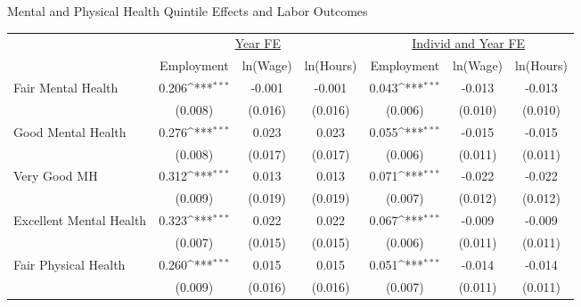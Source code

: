\def\sym#1{\ifmmode^{#1}\else\(^{#1}\)\fi}
\caption{Mental and Physical Health Quintile Effects and Labor Outcomes}
\footnotesize\begin{tabular}{l*{6}{c}}
                    &\multicolumn{3}{c}{\underline{Year FE}}                          &\multicolumn{3}{c}{\underline{Individ and Year FE}}              \\\cmidrule(lr){2-4}\cmidrule(lr){5-7}
                    &\multicolumn{1}{c}{Employment}&\multicolumn{1}{c}{ln(Wage)}&\multicolumn{1}{c}{ln(Hours)}&\multicolumn{1}{c}{Employment}&\multicolumn{1}{c}{ln(Wage)}&\multicolumn{1}{c}{ln(Hours)}\\
\hline
Fair Mental Health  &       0.206\sym{***}&      -0.001         &      -0.001         &       0.043\sym{***}&      -0.013         &      -0.013         \\
                    &     (0.008)         &     (0.016)         &     (0.016)         &     (0.006)         &     (0.010)         &     (0.010)         \\
Good Mental Health  &       0.276\sym{***}&       0.023         &       0.023         &       0.055\sym{***}&      -0.015         &      -0.015         \\
                    &     (0.008)         &     (0.017)         &     (0.017)         &     (0.006)         &     (0.011)         &     (0.011)         \\
Very Good MH        &       0.312\sym{***}&       0.013         &       0.013         &       0.071\sym{***}&      -0.022         &      -0.022         \\
                    &     (0.009)         &     (0.019)         &     (0.019)         &     (0.007)         &     (0.012)         &     (0.012)         \\
Excellent Mental Health&       0.323\sym{***}&       0.022         &       0.022         &       0.067\sym{***}&      -0.009         &      -0.009         \\
                    &     (0.007)         &     (0.015)         &     (0.015)         &     (0.006)         &     (0.011)         &     (0.011)         \\
Fair Physical Health&       0.260\sym{***}&       0.015         &       0.015         &       0.051\sym{***}&      -0.014         &      -0.014         \\
                    &     (0.009)         &     (0.016)         &     (0.016)         &     (0.007)         &     (0.011)         &     (0.011)         \\

\end{tabular}
